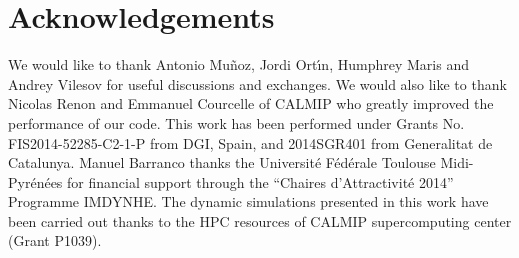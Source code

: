 \chapter{Acknowledgements}
	We would like to thank Antonio Mu\~noz, Jordi Ort\'{\i}n, Humphrey Maris  and Andrey Vilesov for useful discussions and exchanges. We would also like to thank Nicolas Renon and Emmanuel Courcelle of CALMIP who greatly improved the performance of our code. This work has been performed under Grants No. FIS2014-52285-C2-1-P from DGI, Spain, and  2014SGR401 from Generalitat de Catalunya. Manuel Barranco thanks the Universit\'e F\'ed\'erale Toulouse Midi-Pyr\'en\'ees for financial support through the ``Chaires d'Attractivit\'e 2014'' Programme IMDYNHE. The dynamic simulations presented in this work have been carried out thanks to the HPC resources of CALMIP supercomputing center (Grant P1039).